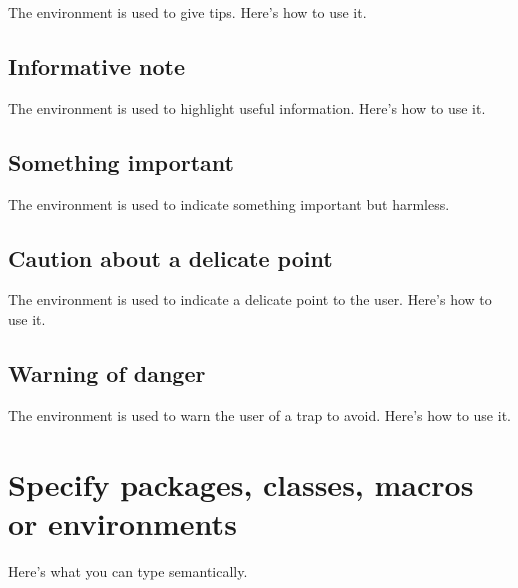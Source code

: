 The  environment is used to give tips. Here's how to use it.




\subsection{Informative note}

The  environment is used to highlight useful information. Here's how to use it.




\subsection{Something important}

The  environment is used to indicate something important but harmless.




\subsection{Caution about a delicate point}

The  environment is used to indicate a delicate point to the user. Here's how to use it.




\subsection{Warning of danger}

The  environment is used to warn the user of a trap to avoid. Here's how to use it.




\section{Specify packages, classes, macros or environments}

Here's what you can type semantically.


